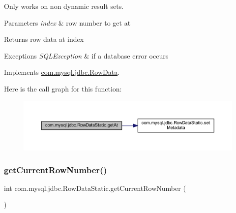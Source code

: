 Only works on non dynamic result sets.


\begin{DoxyParams}{Parameters}
{\em index} & row number to get at \\
\hline
\end{DoxyParams}
\begin{DoxyReturn}{Returns}
row data at index 
\end{DoxyReturn}

\begin{DoxyExceptions}{Exceptions}
{\em S\+Q\+L\+Exception} & if a database error occurs \\
\hline
\end{DoxyExceptions}


Implements \mbox{\hyperlink{interfacecom_1_1mysql_1_1jdbc_1_1_row_data_a25cc7589897136ff05959212ce3e9063}{com.\+mysql.\+jdbc.\+Row\+Data}}.

Here is the call graph for this function\+:
\nopagebreak
\begin{figure}[H]
\begin{center}
\leavevmode
\includegraphics[width=350pt]{classcom_1_1mysql_1_1jdbc_1_1_row_data_static_a02904125e29bcc258c12f839338a4937_cgraph}
\end{center}
\end{figure}
\mbox{\label{classcom_1_1mysql_1_1jdbc_1_1_row_data_static_a199a2308d1218dbf9807a32158e307f4}} 
\subsubsection{\texorpdfstring{get\+Current\+Row\+Number()}{getCurrentRowNumber()}}
{\footnotesize\ttfamily int com.\+mysql.\+jdbc.\+Row\+Data\+Static.\+get\+Current\+Row\+Number (\begin{DoxyParamCaption}{ }\end{DoxyParamCaption})}

